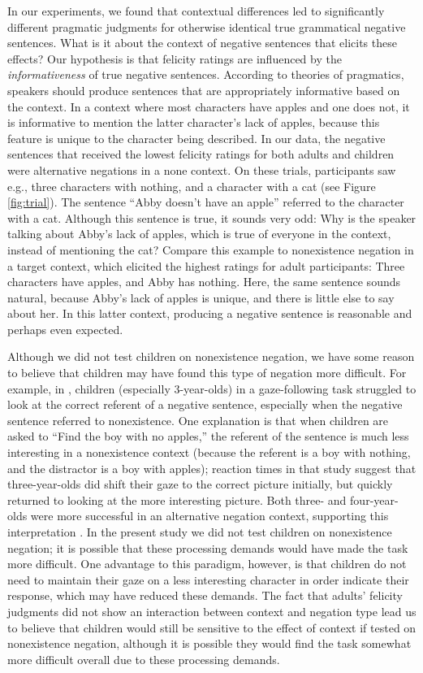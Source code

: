 \documentclass[man, noapacite]{apa2}
\begin{document}
In our experiments, we found that contextual differences led to significantly different pragmatic judgments for otherwise identical true grammatical negative sentences. What is it about the context of negative sentences that elicits these effects? Our hypothesis is that felicity ratings are influenced by the \emph{informativeness} of true negative sentences. According to theories of pragmatics, speakers should produce sentences that are appropriately informative based on the context. In a context where most characters have apples and one does not, it is informative to mention the latter character's lack of apples, because this feature is unique to the character being described. In our data, the negative sentences that received the lowest felicity ratings for both adults and children were alternative negations in a none context. On these trials, participants saw e.g., three characters with nothing, and a character with a cat (see Figure \ref{fig:trial}). The sentence ``Abby doesn't have an apple'' referred to the character with a cat. Although this sentence is true, it sounds very odd: Why is the speaker talking about Abby's lack of apples, which is true of everyone in the context, instead of mentioning the cat? Compare this example to nonexistence negation in a target context, which elicited the highest ratings for adult participants: Three characters have apples, and Abby has nothing. Here, the same sentence sounds natural, because Abby's lack of apples is unique, and there is little else to say about her. In this latter context, producing a negative sentence is reasonable and perhaps even expected.

Although we did not test children on nonexistence negation, we have some reason to believe that children may have found this type of negation more difficult. For example, in , children (especially 3-year-olds) in a gaze-following task struggled to look at the correct referent of a negative sentence, especially when the negative sentence referred to nonexistence. One explanation is that when children are asked to ``Find the boy with no apples,'' the referent of the sentence is much less interesting in a nonexistence context (because the referent is a boy with nothing, and the distractor is a boy with apples); reaction times in that study suggest that three-year-olds did shift their gaze to the correct picture initially, but quickly returned to looking at the more interesting picture. Both three- and four-year-olds were more successful in an alternative negation context, supporting this interpretation \cite{nordmeyer2014b}. In the present study we did not test children on nonexistence negation; it is possible that these processing demands would have made the task more difficult. One advantage to this paradigm, however, is that children do not need to maintain their gaze on a less interesting character in order indicate their response, which may have reduced these demands. The fact that adults' felicity judgments did not show an interaction between context and negation type lead us to believe that children would still be sensitive to the effect of context if tested on nonexistence negation, although it is possible they would find the task somewhat more difficult overall due to these processing demands.
\end{document}

